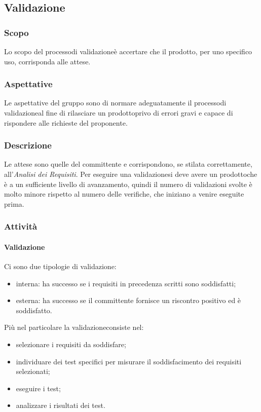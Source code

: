 \subsection{Validazione}

\subsubsection{Scopo}
Lo scopo del processo\glosp di validazione\glosp è accertare che il prodotto\glo, per uno specifico uso, corrisponda alle attese.

\subsubsection{Aspettative}
Le aspettative del gruppo sono di normare adeguatamente il processo\glosp di validazione\glosp al fine di rilasciare un prodotto\glosp privo di errori gravi e capace di rispondere alle richieste del proponente.

\subsubsection{Descrizione}
Le attese sono quelle del committente e corrispondono, se stilata correttamente, all'\textit{Analisi dei Requisiti}. 
Per eseguire una validazione\glosp si deve avere un prodotto\glosp che è a un sufficiente livello di avanzamento, quindi il numero di validazioni svolte è molto minore rispetto al numero delle verifiche, che iniziano a venire eseguite prima.

\subsubsection{Attività}
	\paragraph{Validazione}
	Ci sono due tipologie di validazione\glo:
	\begin{itemize}
		\item interna: ha successo se i requisiti in precedenza scritti sono soddisfatti;
		\item esterna: ha successo se il committente fornisce un riscontro positivo ed è soddisfatto.
	\end{itemize}
	Più nel particolare la validazione\glosp consiste nel:	
	\begin{itemize}
		\item selezionare i requisiti da soddisfare;
		\item individuare dei test specifici per misurare il soddisfacimento dei requisiti selezionati;
		\item eseguire i test;
		\item analizzare i risultati dei test.
	\end{itemize}